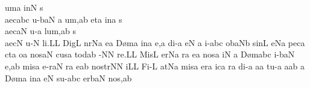 \sgn {}um\punctum a\egn
\spatium
\sgn {}in\punctum N\egn
\spatium
\sgn s{\\ae}{c}\quilismascandicus abc\egn
\sgn {}u{-}\climacus baN\egn
\custos a\lineaproxima
u{m,}\punctum a\augmentum b\egn
\spatium
\divisiominor
\spatium
\sgn {}et\punctum a\egn
\spatium
\sgn {}in\punctum a\egn
\spatium
\sgn s{\\ae}c\clivis aN\egn
\sgn {}u-\punctum a\egn
\sgn lu{m,}\pes ab\egn
\spatium
\sgn s{\\ae}c\punctum N\egn
\sgn {}u-\punctum N\egn
\sgn li.\punctum L\augmentum L\egn
\spatium
\divisiofinalis
\spatium
\sgn Dig\punctum L\egn
\sgn n{\a}r\pes Na\egn
\sgn {}e{}\punctum a\egn
\spatium
\sgn D{\o}m\punctum a\egn
\sgn {}in\punctum a\egn
\sgn {}e,\punctum a\egn
\spatium
\sgn di-\punctum a\egn
\sgn {}e{}\punctum N\egn
\spatium\custos a\lineaproxima
\sgn {}i-\quilismascandicus abc\egn
{}o{}\clivis ba\augmentumduplex Nb\egn
\spatium
\divisiominor
\spatium
\sgn sin\punctum L\egn
\sgn {}e{}\pes Na\egn
\spatium
\sgn pec\punctum a\egn
\sgn c{\a}t\punctum a\egn
\sgn {}o{}\punctum a\egn
\spatium
\sgn nos\clivis aN\egn
\spatium
\sgn cus\punctum a\egn
\sgn tod\pes ab\egn
\sgn {}{\\i}-\punctum N\augmentum N\egn
\sgn re.\punctum L\augmentum L\egn
\spatium
\divisiofinalis
\spatium
\sgn Mis\punctum L\egn
\sgn {}er\pes Na\egn
\sgn {}{\e}r\punctum a\egn
\sgn {}e{}\punctum a\egn
\spatium
\sgn nos\punctum a\egn
{}i{}\punctum N\egn
\spatium\custos a\lineaproxima
\sgn D{\o}m\quilismascandicus abc\egn
\sgn {}i-\climacus baN\egn
{}e,\punctum a\augmentum b\egn
\spatium
\divisiominor
\spatium
\sgn mis\punctum a\egn
\sgn {}e{-r}\clivis aN\egn
\sgn {}{\e}r\punctum a\egn
\sgn {}e{}\pes ab\egn
\spatium
\sgn no{str}\punctum N\augmentum N\egn
\sgn {}i{}\punctum L\augmentum L\egn
\spatium
\divisiofinalis
\spatium
\sgn Fi-\punctum L\egn
\sgn {}at\pes Na\egn
\spatium
\sgn mis\punctum a\egn
\sgn {}er\punctum a\egn
\sgn {}ic\punctum a\egn
\sgn {}{\o}r\punctum a\egn
\sgn di-\punctum a\egn
\sgn {}a{}\punctum a\egn
\spatium
\sgn tu-\punctum a\egn
\sgn {}a{}\punctum a\augmentum b\egn
\spatium\custos a\lineaproxima
\sgn D{\o}m\punctum a\egn
\sgn {}in\punctum a\egn
\sgn {}e{}\punctum N\egn
\spatium
\sgn su-\quilismascandicus abc\egn
{}er\climacus baN\egn
\spatium
\sgn no{s,}\punctum a\augmentum b\egn
\spatium
\divisiominor
